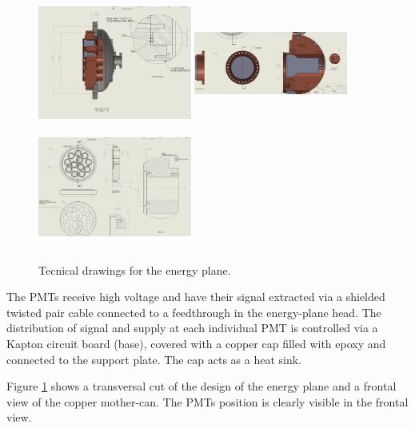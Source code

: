 \documentclass{article}
\begin{document}
\begin{figure}[tph!]
  \begin{center}
    \includegraphics[height=4cm,width=0.45\textwidth]{img/SUPERCAN}
    \includegraphics[height=4cm,width=0.45\textwidth]{img/SUPERCAN_3}
	  \includegraphics[height=4cm,width=0.45\textwidth]{img/SUPERCAN_2}
  \end{center}
  \caption{Tecnical drawings for the energy plane. }
  \label{fig:des}
\end{figure}

The PMTs receive high voltage and have their signal extracted via a
shielded twisted pair cable connected to a feedthrough in the energy-plane head. The distribution of
signal and supply at each individual PMT is controlled via a
Kapton circuit board (base), covered with a
copper cap filled with epoxy and connected to the support plate. The cap acts as a heat sink.

Figure \ref{fig:des} shows a transversal cut of the design of the energy plane and a frontal view of the copper mother-can. The PMTs position is clearly visible in the frontal view. 



\end{document}
